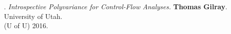 \paper. \textit{Introspective Polyvariance for Control-Flow Analyses.}
\textbf{Thomas Gilray}.
University of Utah.
\\(U of U) 2016. 
\\ \vspace{-0.1cm}\\
